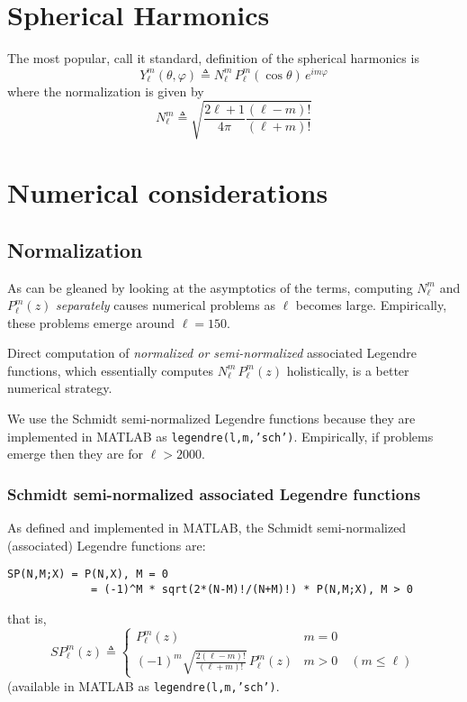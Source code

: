 \documentclass[a4paper,10pt]{article}
\newcommand{\dfn}{\triangleq}
\begin{document}
\section{Spherical Harmonics}

The most popular, call it standard, definition of the spherical harmonics is
\[
	Y_{\ell}^{m}(\theta,\varphi)\dfn
		N_{\ell}^{m}\,
		P_{\ell}^{m}(\cos\theta)\,
		e^{i m\varphi}
\]
where the normalization is given by
\[
	N_{\ell}^{m}\dfn\sqrt{\frac{2\ell+1}{4\pi}\frac{(\ell-m)!}{(\ell+m)!}}
\]

\section{Numerical considerations}

\subsection{Normalization}

As can be gleaned by looking at the asymptotics of the terms, computing $N_{\ell}^{m}$ and $P_{\ell}^{m}(z)$ \emph{separately} causes numerical problems as $\ell$ becomes large. Empirically, these problems emerge around $\ell=150$.

Direct computation of \emph{normalized or semi-normalized} associated Legendre functions, which essentially computes $N_{\ell}^{m}\,P_{\ell}^{m}(z)$ holistically, is a better numerical strategy.

We use the Schmidt semi-normalized Legendre functions because they are implemented in MATLAB as {\tt\color{blue}legendre(l,m,'sch')}. Empirically, if problems emerge then they are for $\ell>2000$.

\subsubsection{Schmidt semi-normalized associated Legendre functions}

As defined and implemented in MATLAB, the Schmidt semi-normalized (associated) Legendre functions are:
\color{blue}\begin{verbatim}
SP(N,M;X) = P(N,X), M = 0
			 = (-1)^M * sqrt(2*(N-M)!/(N+M)!) * P(N,M;X), M > 0
\end{verbatim}\color{black}
that is,
\[
	S\!P_{\ell}^{m}(z)\dfn
		\begin{cases}
			\displaystyle
			P_{\ell}^{m}(z) &m=0 \\
			\displaystyle
			(-1)^{m}\sqrt{\frac{2(\ell-m)!}{(\ell+m)!}}\,
			P_{\ell}^{m}(z) &m>0\quad (m\leq\ell)
		\end{cases}
\]
(available in MATLAB as {\tt\color{blue}legendre(l,m,'sch')}.
\end{document}
